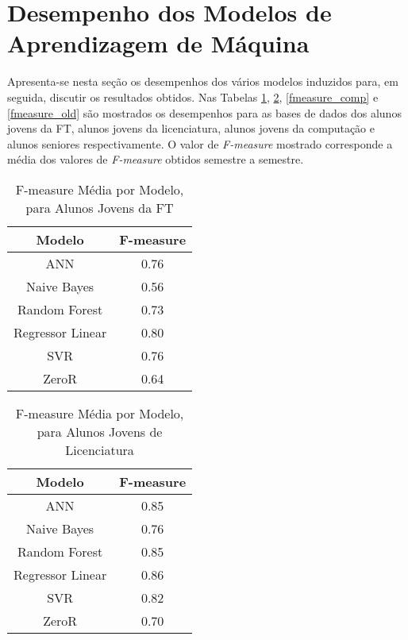 \section{Desempenho dos Modelos de Aprendizagem de Máquina} \label{results_ml_models}
Apresenta-se nesta seção os desempenhos dos vários modelos induzidos 
para, em seguida, discutir os resultados obtidos. Nas Tabelas
\ref{fmeasure_ft}, \ref{fmeasure_lic}, \ref{fmeasure_comp} e \ref{fmeasure_old} são 
mostrados os desempenhos para as bases de dados dos alunos jovens da FT, alunos
jovens da licenciatura, alunos jovens da computação e alunos seniores
respectivamente. O valor de \textit{F-measure} mostrado corresponde a média dos valores de
\textit{F-measure} obtidos semestre a semestre.  

\begin{table}
\caption{F-measure Média por Modelo, para Alunos Jovens da FT}
\begin{center}
\begin{tabular}[c]{| c | c |}
    \hline
    \textbf{Modelo} & \textbf{F-measure} \\
    \hline
    ANN              & 0.76 \\
    \hline
    Naive Bayes      & 0.56 \\
    \hline
    Random Forest    & 0.73 \\
    \hline
    Regressor Linear & 0.80 \\
    \hline
    SVR              & 0.76 \\
    \hline
    ZeroR            & 0.64 \\
    \hline
\end{tabular}
\end{center}
\label{fmeasure_ft}
\end{table}

\begin{table}
\caption{F-measure Média por Modelo, para Alunos Jovens de Licenciatura}
\begin{center}
\begin{tabular}[c]{| c | c |}
    \hline
    \textbf{Modelo} & \textbf{F-measure} \\
    \hline
    ANN              & 0.85 \\
    \hline
    Naive Bayes      & 0.76 \\
    \hline
    Random Forest    & 0.85 \\
    \hline
    Regressor Linear & 0.86 \\
    \hline
    SVR              & 0.82 \\
    \hline
    ZeroR            & 0.70 \\
    \hline
\end{tabular}
\end{center}
\label{fmeasure_lic}
\end{table}

